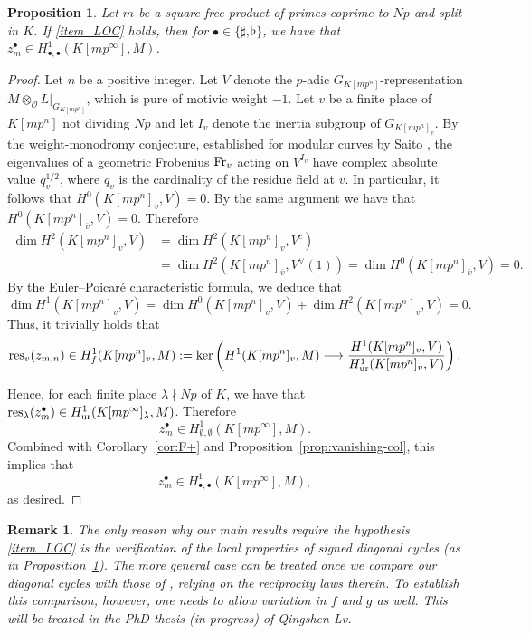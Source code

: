 \documentclass{amsart}
\numberwithin{equation}{section}
\newtheorem{proposition}[theorem]{Proposition}
\newtheorem{remark}[theorem]{Remark}
\newcommand{\res}{\textup{res}}
\newcommand{\ur}{\textup{ur}}
\newcommand{\Fr}{{\rm Fr}}
\begin{document}
\begin{proposition}\label{prop:local-ap=0}
    Let $m$ be a square-free product of primes coprime to $Np$ and split in $K$. If {\rm \eqref{item_LOC}} holds, then for $\bullet\in\lbrace \sharp,\flat\rbrace$, we have that $z_m^\bullet\in H^{1}_{\bullet,\bullet}(K[mp^\infty],M)$.
\end{proposition}
\begin{proof}
    Let $n$ be a positive integer. Let $V$ denote the $p$-adic $G_{K[mp^n]}$-representation $M\otimes_{\mathcal{O}}L\vert_{G_{K[mp^n]}}$, which is pure of motivic weight $-1$. Let $v$ be a finite place of $K[mp^n]$ not dividing $Np$ and let $I_v$ denote the inertia subgroup of $G_{K[mp^n]_v}$. By the weight-monodromy conjecture, established for modular curves by Saito \cite{Saito97}, the eigenvalues of a geometric Frobenius $\Fr_v$ acting on $V^{I_{v}}$ have complex absolute value $q_v^{1/2}$, where $q_v$ is the cardinality of the residue field at $v$. In particular, it follows that $H^0(K[mp^n]_v,V)=0$. By the same argument we have that $H^0(K[mp^n]_{\overline{v}},V)=0$. Therefore
    \begin{align*}
    \dim H^2(K[mp^n]_v,V)&=\dim H^2(K[mp^n]_{\overline{v}},V^c) \\
    &=\dim H^2(K[mp^n]_{\overline{v}},V^\vee(1))=\dim H^0(K[mp^n]_{\overline{v}},V)=0.
    \end{align*}
    By the Euler--Poicar\'e characteristic formula, we deduce that
    \[
    \dim H^1(K[mp^n]_v,V)=\dim H^0(K[mp^n]_v,V)+\dim H^2(K[mp^n]_v,V)=0.
    \]
    Thus, it trivially holds that
    \[
    \res_v(z_{m,n})\in H^1_{f}(K[mp^n]_v,M):= \ker\left( H^1(K[mp^n]_v,M)\longrightarrow \frac{H^1(K[mp^n]_v,V)}{H^1_{\ur}(K[mp^n]_v,V)}\right).
    \]
    
    Hence, for each finite place $\lambda\nmid Np$ of $K$, we have that $\res_{\lambda}(z_m^\bullet)\in H^1_{\ur}(K[mp^\infty]_\lambda,M)$. Therefore
    \[
    z_m^\bullet\in H^{1}_{\emptyset,\emptyset}(K[mp^\infty],M).
    \]
    Combined with Corollary~\ref{cor:F+} and  Proposition~\ref{prop:vanishing-col}, this implies that
    \[
    z_m^\bullet\in H^{1}_{\bullet,\bullet}(K[mp^\infty],M),
    \]
    as desired.
\end{proof}

\begin{remark}
    \label{rem_2025_10_13_0908}
 The only reason why our main results require the hypothesis \textup{\eqref{item_LOC}} is the verification of the local properties of signed diagonal cycles (as in Proposition~\ref{prop:local-ap=0}). The more general case can be treated once we compare our diagonal cycles with those of \cite{DarmonRotger, BSV}, relying on the reciprocity laws therein. To establish this comparison, however, one needs to allow variation in $f$ and $g$ as well. This will be treated in the PhD thesis (in progress) of Qingshen Lv. %
\end{remark}
\end{document}
